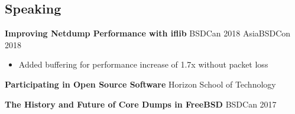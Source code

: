 \documentclass[resmargin,line,12pt]{res}
\begin{document}
{\begin{resume}
\vspace*{.20in}
{\color{Black}
  \vspace{-.03in}
  \section{\sc Speaking}}

\color{black}
{\bf Improving Netdump Performance with iflib} BSDCan 2018 AsiaBSDCon 2018\\
\vspace{-.16in}
\begin{itemize}
\item Added buffering for performance increase of 1.7x without packet loss
\end{itemize}
\vspace{-.10in}

\color{black}
{\bf Participating in Open Source Software} Horizon School of Technology \\
\vspace{-.16in}
\vspace{-.10in}

\color{black}
{\bf The History and Future of Core Dumps in FreeBSD} BSDCan 2017 \\


\end{resume}}
\end{document}
